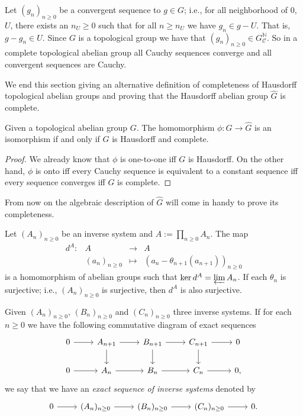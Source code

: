 Let $(g_n)_{n\geq 0}$ be a convergent sequence to $g\in G$; i.e., for all neighborhood of $0$, $U$, there exists an $n_U\geq 0$ such that for all $n\geq n_U$ we have $g_n\in g-U$. That is, $g-g_n\in U$. Since $G$ is a topological group we have that $(g_n)_{n\geq 0}\in G^\mathbb N_\mathcal C$. So in a complete topological abelian group all Cauchy sequences converge and all convergent sequences are Cauchy.

We end this section giving an alternative definition of completeness of Hausdorff topological abelian groups and proving that the Hausdorff abelian group $\hat G$ is complete.
\begin{thm}\label{completeness}
    Given a topological abelian group $G$. The homomorphism $\phi\colon G\to \hat G$ is an isomorphism if and only if $G$ is Hausdorff and complete.
\end{thm}
\begin{proof}
    We already know that $\phi$ is one-to-one iff $G$ is Hausdorff. On the other hand, $\phi$ is onto iff every Cauchy sequence is equivalent to a constant sequence iff every sequence converges iff $G$ is complete.
\end{proof}

From now on the algebraic description of $\hat G$ will come in handy to prove its completeness.

Let $(A_n)_{n\geq 0}$ be an inverse system and $A:=\prod_{n\geq 0}A_n$. The map
\[
\begin{matrix}
    d^A\colon &A&\longrightarrow& A\\
    &(a_n)_{n\geq 0} &\longmapsto & (a_n-\theta_{n+1}(a_{n+1}))_{n\geq 0}
\end{matrix}
\]
is a homomorphism of abelian groups such that $\ker d^A=\varprojlim A_n$. If each $\theta_n$ is surjective; i.e., $(A_n)_{n\geq 0}$ is surjective, then $d^A$ is also surjective. 

\begin{defi}
    Given $(A_n)_{n\geq 0}$, $(B_n)_{n\geq 0}$ and $(C_n)_{n\geq 0}$ three inverse systems. If for each $n\geq 0$ we have the following commutative diagram of exact sequences
    \[
    \begin{tikzcd}
        0 \ar[r] & A_{n+1} \ar[r]\ar[d] & B_{n+1} \ar[r]\ar[d] & C_{n+1} \ar[r]\ar[d] & 0\\
        0 \ar[r] & A_n \ar[r] & B_n \ar[r] & C_n \ar[r] & 0,
    \end{tikzcd}
    \]
    we say that we have an \emph{exact sequence of inverse systems} denoted by
    \[
    \begin{tikzcd}
        0 \ar[r] & (A_n)_{n\geq 0} \ar[r] & (B_n)_{n\geq 0} \ar[r] & (C_n)_{n\geq 0} \ar[r] &0.
    \end{tikzcd}
    \]
\end{defi}

